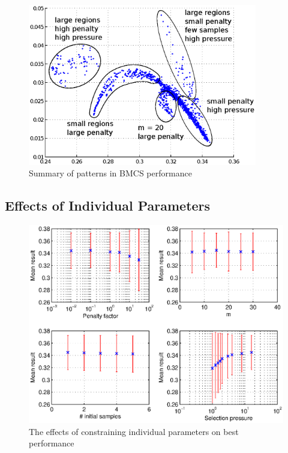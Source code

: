 \documentclass[10pt]{article}
\begin{document}
\begin{itemize}
\begin{figure}
  \begin{center}
    \includegraphics[width=10cm]{bmcs_perf_summary.eps}
    \end{center}
    \caption{Summary of patterns in BMCS performance}
    \label{fig:bmcs_perf_summary}
    \end{figure}

\end{itemize}

\subsection{Effects of Individual Parameters}

\begin{figure}
  \begin{center}
    \includegraphics[width=15cm]{bmcs_plots.eps}
    \end{center}
    \caption{The effects of constraining individual parameters on best
    performance}
    \label{fig:bmcs_plots}
    \end{figure}
\end{document}
